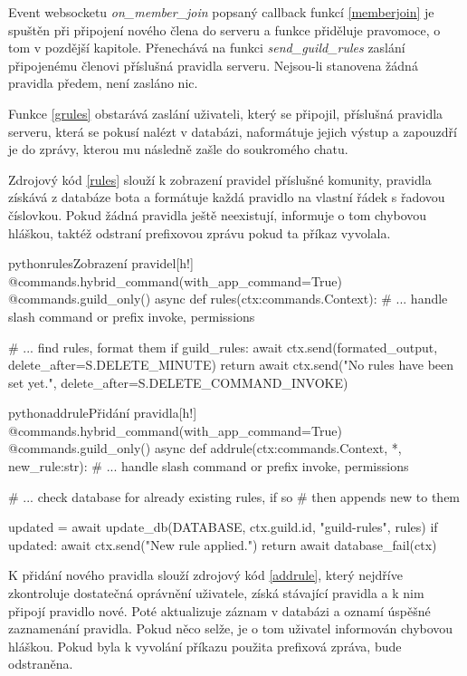 \documentclass[
  program=inf,
biblatex=false,
sourcecodes=true,
joinlists=true,
  figures=true,
  tables=true,
  glossaries=true,
  index=false
]{kidiplom}
\begin{document}
Event websocketu {\it on\_member\_join} popsaný callback funkcí \ref{memberjoin}
je spuštěn při připojení nového člena do serveru a funkce přiděluje pravomoce, o tom v pozdější kapitole. Přenechává
na funkci {\it send\_guild\_rules} zaslání připojenému členovi příslušná pravidla serveru. Nejsou-li stanovena žádná
pravidla předem, není zasláno nic.

Funkce \ref{grules} obstarává zaslání uživateli, který se připojil, příslušná pravidla serveru, která se pokusí nalézt
v databázi, naformátuje jejich výstup a zapouzdří je do zprávy, kterou mu následně zašle do soukromého chatu.

Zdrojový kód \ref{rules} slouží k zobrazení pravidel příslušné komunity, pravidla získává z 
databáze bota a formátuje každá pravidlo na vlastní řádek s řadovou číslovkou. Pokud žádná
pravidla ještě neexistují, informuje o tom chybovou hláškou, taktéž odstraní prefixovou zprávu pokud ta
příkaz vyvolala.

\begin{kicode}{python}{rules}{Zobrazení pravidel}[h!]
  @commands.hybrid_command(with_app_command=True)
  @commands.guild_only()
  async def rules(ctx:commands.Context):
      # ... handle slash command or prefix invoke, permissions
          
      # ... find rules, format them
      if guild_rules:
          await ctx.send(formated_output,
                          delete_after=S.DELETE_MINUTE)
          return
      await ctx.send("No rules have been set yet.",
                     delete_after=S.DELETE_COMMAND_INVOKE)
\end{kicode}

\begin{kicode}{python}{addrule}{Přidání pravidla}[h!]
  @commands.hybrid_command(with_app_command=True)
  @commands.guild_only()
  async def addrule(ctx:commands.Context, *, new_rule:str):
      # ... handle slash command or prefix invoke, permissions
      
      # ... check database for already existing rules, if so
      # then appends new to them
      
      updated = await update_db(DATABASE,
                     ctx.guild.id, "guild-rules", rules)
      if updated:
          await ctx.send("New rule applied.")
          return
      await database_fail(ctx)
\end{kicode}

\newpage
K přidání nového pravidla slouží zdrojový kód \ref{addrule}, který nejdříve zkontroluje dostatečná
oprávnění uživatele, získá stávající pravidla a k nim připojí pravidlo nové. Poté aktualizuje
záznam v databázi a oznamí úspěšné zaznamenání pravidla. Pokud něco selže, je o tom uživatel 
informován chybovou hláškou. Pokud byla k vyvolání příkazu použita prefixová zpráva, bude odstraněna.
\end{document}
